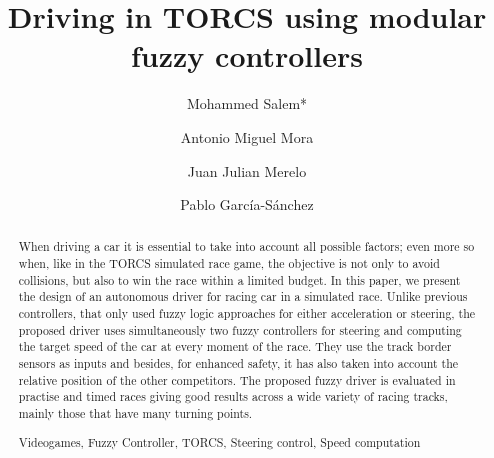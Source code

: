 \documentclass[runningheads,a4paper]{llncs}
\newcommand{\keywords}[1]{\par\addvspace\baselineskip
\noindent\keywordname\enspace\ignorespaces#1}
\newcommand{\keywords}[1]{\par\addvspace\baselineskip
	\noindent\keywordname\enspace\ignorespaces#1}
\begin{document}
		
	\title{Driving in TORCS using modular fuzzy controllers}
	
	
	
	
	
	
	\author{Mohammed Salem*  \and Antonio Miguel Mora \and Juan Julian Merelo  \and Pablo Garc\'ia-S\'anchez }
	
	
	
	
	
	
	\tocauthor{}
	\maketitle
	\begin{abstract}
		
		When driving a car it is essential to take into account all possible
		factors; even more so when, like in the TORCS simulated race game, the
		objective is not only to avoid collisions, but also to win the race
		within a limited budget. In this paper, we present the design of an autonomous
		driver for racing car in a simulated race. Unlike previous controllers, that only used fuzzy logic approaches for either acceleration or steering, the proposed driver uses simultaneously two fuzzy controllers for steering and computing the target speed of the car at every moment of the race. They use the track border sensors as inputs and besides, for enhanced safety, it has also taken into account the relative position of the other competitors.
		The proposed fuzzy driver is evaluated in practise and timed races
		giving good results across a wide variety of racing tracks, mainly
		those that have many turning points.  
		
		\keywords{Videogames, Fuzzy Controller, TORCS, Steering control, Speed computation}
	\end{abstract}
	
\end{document}
